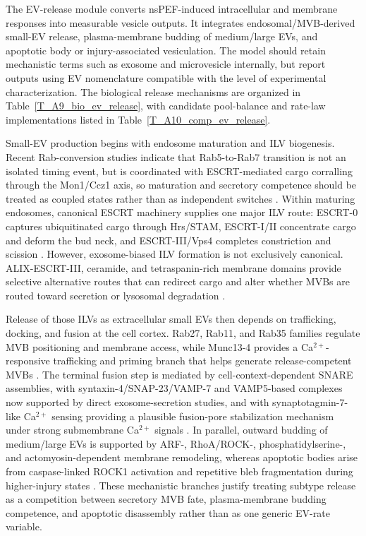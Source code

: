 \documentclass[Afour,sagev,times]{sagej}
\begin{document}
The EV-release module converts nsPEF-induced intracellular and membrane responses into measurable vesicle outputs. It integrates endosomal/MVB-derived small-EV release, plasma-membrane budding of medium/large EVs, and apoptotic body or injury-associated vesiculation. The model should retain mechanistic terms such as exosome and microvesicle internally, but report outputs using EV nomenclature compatible with the level of experimental characterization. The biological release mechanisms are organized in Table~\ref{T_A9_bio_ev_release}, with candidate pool-balance and rate-law implementations listed in Table~\ref{T_A10_comp_ev_release}.

Small-EV production begins with endosome maturation and ILV biogenesis. Recent Rab-conversion studies indicate that Rab5-to-Rab7 transition is not an isolated timing event, but is coordinated with ESCRT-mediated cargo corralling through the Mon1/Ccz1 axis, so maturation and secretory competence should be treated as coupled states rather than as independent switches \cite{ott2025coordination,borchers2023regulatory,solinger2025escrting}. Within maturing endosomes, canonical ESCRT machinery supplies one major ILV route: ESCRT-0 captures ubiquitinated cargo through Hrs/STAM, ESCRT-I/II concentrate cargo and deform the bud neck, and ESCRT-III/Vps4 completes constriction and scission \cite{takahashi2015hrs,wollert2010molecular,pfitzner2020escrt}. However, exosome-biased ILV formation is not exclusively canonical. ALIX-ESCRT-III, ceramide, and tetraspanin-rich membrane domains provide selective alternative routes that can redirect cargo and alter whether MVBs are routed toward secretion or lysosomal degradation \cite{larios2020alix,choezom2022nsmase2,crivelli2022ceramideTransfer,rubinstein2025tetraspanins,villarroyaBeltri2016isgylation}.

Release of those ILVs as extracellular small EVs then depends on trafficking, docking, and fusion at the cell cortex. Rab27, Rab11, and Rab35 families regulate MVB positioning and membrane access, while Munc13-4 provides a Ca$^{2+}$-responsive trafficking and priming branch that helps generate release-competent MVBs \cite{hsu2010rab35,messenger2018munc13,marie2023accessory,izumi2021rab27,tang2026rab27}. The terminal fusion step is mediated by cell-context-dependent SNARE assemblies, with syntaxin-4/SNAP-23/VAMP-7 and VAMP5-based complexes now supported by direct exosome-secretion studies, and with synaptotagmin-7-like Ca$^{2+}$ sensing providing a plausible fusion-pore stabilization mechanism under strong submembrane Ca$^{2+}$ signals \cite{liu2023snare,matsui2023vamp5,woo2017munc13,courtney2023synaptotagmin7}. In parallel, outward budding of medium/large EVs is supported by ARF-, RhoA/ROCK-, phosphatidylserine-, and actomyosin-dependent membrane remodeling, whereas apoptotic bodies arise from caspase-linked ROCK1 activation and repetitive bleb fragmentation during higher-injury states \cite{pang2025arf,dai2019rhoa,menck2017nsmaseMicrovesicles,teixeira2020rock1,ozdemir2021rock1,sakamaki2025mprip}. These mechanistic branches justify treating subtype release as a competition between secretory MVB fate, plasma-membrane budding competence, and apoptotic disassembly rather than as one generic EV-rate variable.
\end{document}
